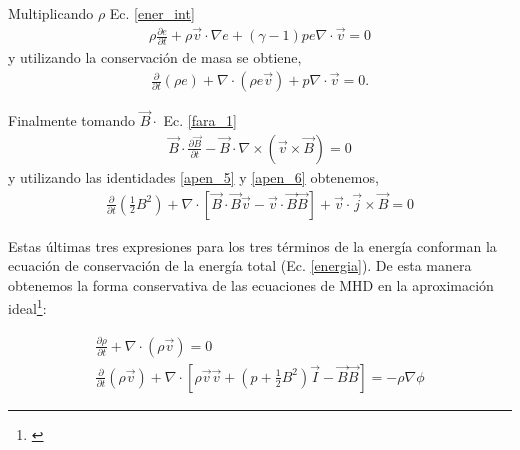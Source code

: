 \documentclass[a4paper,11pt]{report}
\begin{document}
Multiplicando $\rho$ Ec. \ref{ener_int} 
\begin{eqnarray}
   \rho \frac{\partial e}{\partial t} +\rho \vec{v} \cdot \nabla e + (\gamma -1 )pe \nabla \cdot \vec{v} =0
\end{eqnarray}
y utilizando la conservación de masa se obtiene,
\begin{eqnarray}
   \frac{\partial}{\partial t} (\rho e) +\nabla \cdot (\rho e \vec{v}) + p \nabla \cdot \vec{v} =0.
\end{eqnarray}

Finalmente tomando $\vec{B} \cdot$ Ec. \ref{fara_1} 
\begin{eqnarray}
  \vec{B} \cdot \frac{\partial \vec{B}}{\partial t} - \vec{B} \cdot \nabla \times (\vec{v}\times \vec{B})=0
\end{eqnarray}
y utilizando las identidades \ref{apen_5} y \ref{apen_6} obtenemos,
\begin{eqnarray}
     \frac{\partial}{\partial t} (\frac{1}{2} B^2) + \nabla \cdot \left[ \vec{B} \cdot \vec{B}\vec{v} -\vec{v}\cdot\vec{B}\vec{B} \right] + \vec{v} \cdot \vec{j} \times \vec{B} = 0
\end{eqnarray}

Estas últimas tres expresiones para los tres términos de la energía conforman la ecuación de conservación de la energía total (Ec. \ref{energia}). De esta manera obtenemos la forma conservativa de las ecuaciones de MHD en la aproximación ideal\footnote{\citet{goedbloed_2004}}:

\begin{eqnarray}
\frac{\partial \rho}{\partial t} +\nabla \cdot (\rho \vec{v}) = 0\\ \label{conserv_d}
\frac{\partial}{\partial t}(\rho \vec{v}) + \nabla \cdot \left[ \rho \vec{v}\vec{v} + (p+\frac{1}{2}B^2) \vec{I} - \vec{B}\vec{B} \right] = - \rho \nabla \phi   \label{conserv_momento}
\end{eqnarray}
\end{document}
